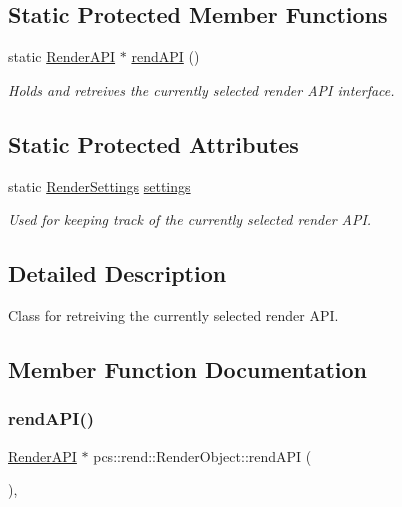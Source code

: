 \subsection*{Static Protected Member Functions}
\begin{DoxyCompactItemize}
\item 
static \hyperlink{structpcs_1_1rend_1_1RenderAPI}{Render\+A\+PI} $\ast$ \hyperlink{classpcs_1_1rend_1_1RenderObject_aed66ebea09229bc1b6b1e853813322df}{rend\+A\+PI} ()
\begin{DoxyCompactList}\small\item\em Holds and retreives the currently selected render A\+PI interface. \end{DoxyCompactList}\end{DoxyCompactItemize}
\subsection*{Static Protected Attributes}
\begin{DoxyCompactItemize}
\item 
static \hyperlink{structpcs_1_1rend_1_1RenderSettings}{Render\+Settings} \hyperlink{classpcs_1_1rend_1_1RenderObject_a354e6b71a0f1a7229a5a57944f047ceb}{settings}
\begin{DoxyCompactList}\small\item\em Used for keeping track of the currently selected render A\+PI. \end{DoxyCompactList}\end{DoxyCompactItemize}


\subsection{Detailed Description}
Class for retreiving the currently selected render A\+PI. 

\subsection{Member Function Documentation}
\mbox{\label{classpcs_1_1rend_1_1RenderObject_aed66ebea09229bc1b6b1e853813322df}} 
\subsubsection{\texorpdfstring{rend\+A\+P\+I()}{rendAPI()}}
{\footnotesize\ttfamily \hyperlink{structpcs_1_1rend_1_1RenderAPI}{Render\+A\+PI} $\ast$ pcs\+::rend\+::\+Render\+Object\+::rend\+A\+PI (\begin{DoxyParamCaption}{ }\end{DoxyParamCaption})\hspace{0.3cm}{\ttfamily [static]}, {\ttfamily [protected]}}



